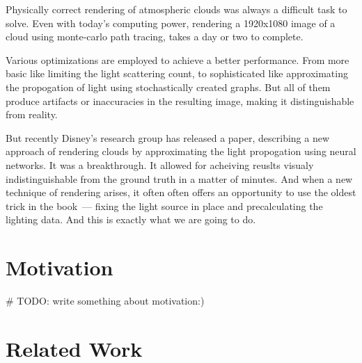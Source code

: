 \documentclass[times,specification,annotation]{itmo-student-thesis}
\begin{document}




\tableofcontents

\startprefacepage

Physically correct rendering of atmospheric clouds was always a difficult task to solve. Even with today's computing power, rendering a 1920x1080 image of a cloud using monte-carlo path tracing, takes a day or two to complete. 

Various optimizations are employed to achieve a better performance. From more basic like limiting the light scattering count, to sophisticated like approximating the propogation of light using stochastically created graphs. But all of them produce artifacts or inaccuracies in the resulting image, making it distinguishable from reality.

But recently Disney's research group has released a paper, describing a new approach of rendering clouds by approximating the light propogation using neural networks. It was a breakthrough. It allowed for acheiving reuslts visualy indistinguishable from the ground truth in a matter of minutes. And when a new technique of rendering arises, it often often offers an opportunity to use the oldest trick in the book~--- fixing the light source in place and precalculating the lighting data. And this is exactly what we are going to do.


\chapter{Motivation}
# TODO: write something about motivation:)

\chapter{Related Work}
\end{document}
